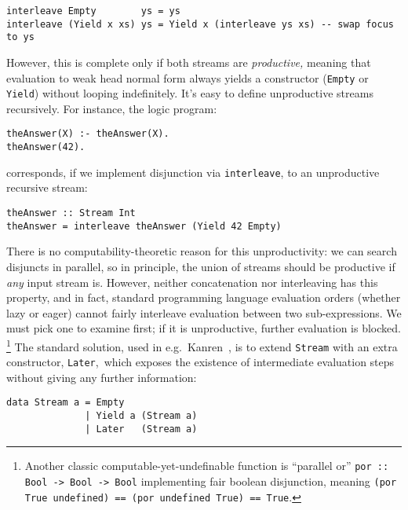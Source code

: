 \documentclass[acmsmall,screen,review,anonymous,dvipsnames,svgnames]{acmart}
\newcommand\hask[1]{\texttt{#1}}
\newcommand\ttt\texttt
\begin{document}
\begin{verbatim}
interleave Empty        ys = ys
interleave (Yield x xs) ys = Yield x (interleave ys xs) -- swap focus to ys
\end{verbatim}

\noindent
However, this is complete only if both streams are \emph{productive,} meaning that evaluation to weak head normal form always yields a constructor (\hask{Empty} or \hask{Yield}) without looping indefinitely.
It's easy to define unproductive streams recursively.
For instance, the logic program:

\begin{verbatim}
theAnswer(X) :- theAnswer(X).
theAnswer(42).
\end{verbatim}

\noindent
corresponds, if we implement disjunction via \ttt{interleave}, to an unproductive recursive stream:

\begin{verbatim}
theAnswer :: Stream Int
theAnswer = interleave theAnswer (Yield 42 Empty)
\end{verbatim}


\noindent
There is no computability-theoretic reason for this unproductivity: we can search disjuncts in parallel, so in principle, the union of streams should be productive if \emph{any} input stream is.
However, neither concatenation nor interleaving has this property, and in fact, standard programming language evaluation orders (whether lazy or eager) cannot fairly interleave evaluation between two sub-expressions.
We must pick one to examine first; if it is unproductive, further evaluation is blocked.%
\footnote{Another classic computable-yet-undefinable function is ``parallel or'' \hask{por :: Bool -> Bool -> Bool} implementing fair boolean disjunction, meaning \hask{(por True undefined) == (por undefined True) == True}.}
%
The standard solution, used in e.g.~\textmu{}Kanren~\citep{muKanren}, is to extend \hask{Stream} with an extra constructor, \hask{Later},\footnotemark\ which exposes the existence of intermediate evaluation steps without giving any further information:

\begin{verbatim}
data Stream a = Empty
              | Yield a (Stream a)
              | Later   (Stream a)
\end{verbatim}
\end{document}

